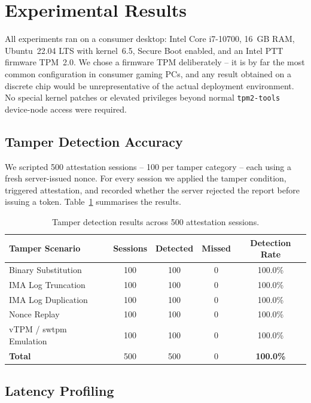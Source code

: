 \documentclass[11pt]{article}
\begin{document}
\section{Experimental Results}
\label{sec:evaluation}

All experiments ran on a consumer desktop: Intel Core i7-10700, 16~GB RAM, Ubuntu~22.04 LTS with kernel~6.5, Secure Boot enabled, and an Intel PTT firmware TPM~2.0. We chose a firmware TPM deliberately -- it is by far the most common configuration in consumer gaming PCs, and any result obtained on a discrete chip would be unrepresentative of the actual deployment environment. No special kernel patches or elevated privileges beyond normal \texttt{tpm2-tools} device-node access were required.

\subsection{Tamper Detection Accuracy}

We scripted 500 attestation sessions -- 100 per tamper category -- each using a fresh server-issued nonce. For every session we applied the tamper condition, triggered attestation, and recorded whether the server rejected the report before issuing a token. Table~\ref{tab:detection} summarises the results.

\begin{table}[h]
\centering
\caption{Tamper detection results across 500 attestation sessions.}
\label{tab:detection}
\begin{tabular}{@{}lcccc@{}}
\toprule
\textbf{Tamper Scenario} & \textbf{Sessions} & \textbf{Detected} & \textbf{Missed} & \textbf{Detection Rate} \\
\midrule
Binary Substitution          & 100 & 100 & 0 & 100.0\% \\
IMA Log Truncation           & 100 & 100 & 0 & 100.0\% \\
IMA Log Duplication          & 100 & 100 & 0 & 100.0\% \\
Nonce Replay                 & 100 & 100 & 0 & 100.0\% \\
vTPM / swtpm Emulation       & 100 & 100 & 0 & 100.0\% \\
\midrule
\textbf{Total}               & 500 & 500 & 0 & \textbf{100.0\%} \\
\bottomrule
\end{tabular}
\end{table}

\subsection{Latency Profiling}
\end{document}
